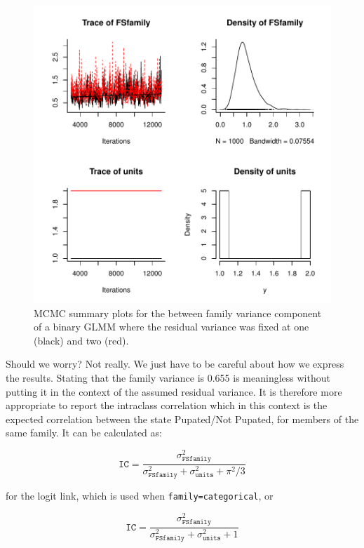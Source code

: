 \documentclass{article}
\begin{document}
\begin{figure}[!h]
\begin{center}
\includegraphics{Lecture2-068}
\end{center}
\caption{MCMC summary plots for the between family variance component of a binary GLMM where the residual variance was fixed at one (black) and two (red).}
\label{Bin2-fig}
\end{figure}

Should we worry? Not really. We just have to be careful about how we express the results. Stating that the family variance is 0.655 is meaningless without putting it in the context of the assumed residual variance. It is therefore more appropriate to report the intraclass correlation which in this context is the expected correlation between the state Pupated/Not Pupated, for members of the same family. It can be calculated as:

\begin{equation}
\texttt{IC} =  \frac{\sigma^{2}_{\texttt{FSfamily}}}{\sigma^{2}_{\texttt{FSfamily}}+\sigma^{2}_{\texttt{units}}+\pi^{2}/3} 
\end{equation} 

for the logit link, which is used when \texttt{family=categorical}, or 

\begin{equation}
\texttt{IC} =  \frac{\sigma^{2}_{\texttt{FSfamily}}}{\sigma^{2}_{\texttt{FSfamily}}+\sigma^{2}_{\texttt{units}}+1} 
\end{equation} 
\end{document}
